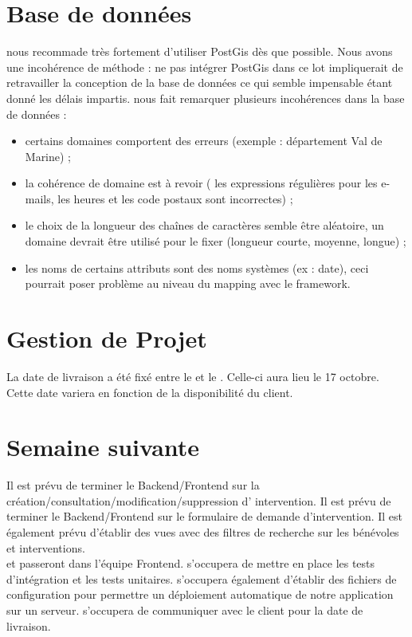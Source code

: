 \documentclass [a4paper] {article}
\begin{document}
\section{Base de données}
\nomTuteurPedago{} nous recommade très fortement d'utiliser PostGis dès que possible. Nous avons une incohérence de méthode : ne pas intégrer PostGis dans ce lot impliquerait de retravailler la conception de la base de données ce qui semble impensable étant donné les délais impartis. 
\nomTuteurPedago{} nous fait remarquer plusieurs incohérences dans la base de données  : 
\begin{itemize}
\item certains domaines comportent des erreurs (exemple : département Val de Marine) ;
\item la cohérence de domaine est à revoir ( les expressions régulières pour les e-mails, les heures et les code postaux sont incorrectes) ;
\item le choix de la longueur des chaînes de caractères semble être aléatoire, un domaine devrait être utilisé pour le fixer (longueur courte, moyenne, longue) ;
\item les noms de certains attributs sont des noms systèmes (ex : date), ceci pourrait poser problème au niveau du mapping avec le framework.
\end{itemize}

\section{Gestion de Projet}
La date de livraison a été fixé entre le \RD{} et le \CP{}. Celle-ci aura lieu le 17 octobre. Cette date variera en fonction de la disponibilité du client.

\section{Semaine suivante}
Il est prévu de terminer le Backend/Frontend sur la création/consultation/modification/suppression d' intervention.
Il est prévu de terminer le Backend/Frontend sur le formulaire de demande d'intervention.
Il est également prévu d'établir des vues avec des filtres de recherche sur les bénévoles et interventions. \\
\Francois{} et \Juliana{} passeront dans l'équipe Frontend. 
\Matthieu{} s'occupera de mettre en place les tests d'intégration et les tests unitaires. 
\Matthieu{} s'occupera également d'établir des fichiers de configuration pour permettre un déploiement automatique de notre application sur un serveur.
\Pierre{} s'occupera de communiquer avec le client pour la date de livraison.


\newpage
\end{document}
